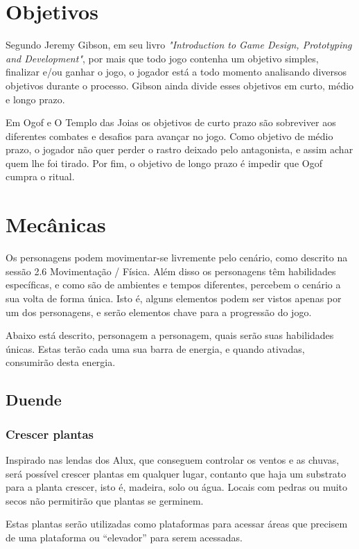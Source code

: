 \section{Objetivos}

Segundo Jeremy Gibson, em seu livro \textit{"Introduction to Game Design, Prototyping and Development"}, por mais que todo jogo contenha um objetivo simples, finalizar e/ou ganhar o jogo, o jogador está a todo momento analisando diversos objetivos durante o processo. Gibson ainda divide esses objetivos em curto, médio e longo prazo. \cite{gibson2014}

Em Ogof e O Templo das Joias os objetivos de curto prazo são sobreviver aos diferentes combates e desafios para avançar no jogo. Como objetivo de médio prazo, o jogador não quer perder o rastro deixado pelo antagonista, e assim achar quem lhe foi tirado. Por fim, o objetivo de longo prazo é impedir que Ogof cumpra o ritual.

\section{Mecânicas}

Os personagens podem movimentar-se livremente pelo cenário, como descrito na sessão 2.6 Movimentação / Física. Além disso os personagens têm habilidades específicas, e como são de ambientes e tempos diferentes, percebem o cenário a sua volta de forma única. Isto é, alguns elementos podem ser vistos apenas por um dos personagens, e serão elementos chave para a progressão do jogo.

Abaixo está descrito, personagem a personagem, quais serão suas habilidades únicas. Estas terão cada uma sua barra de energia, e quando ativadas, consumirão desta energia.

\subsection{Duende}
\subsubsection{Crescer plantas}
Inspirado nas lendas dos Alux, que conseguem controlar os ventos e as chuvas, será possível crescer plantas em qualquer lugar, contanto que haja um substrato para a planta crescer, isto é,  madeira, solo ou água. Locais com pedras ou muito secos não permitirão que plantas se germinem.

Estas plantas serão utilizadas como plataformas para acessar áreas que precisem de uma plataforma ou ``elevador'' para serem acessadas.

